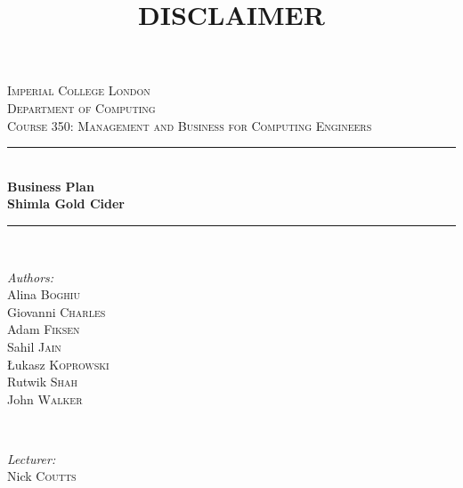 \documentclass[11pt]{article}
\begin{document}

\begin{titlepage}
\newcommand{\HRule}{\rule{\linewidth}{0.5mm}}
\center
\textsc{\LARGE Imperial College London}  \\[1.5cm]
\textsc{\Large Department of Computing}  \\[0.5cm]
\textsc{\large Course 350: Management and Business for Computing Engineers} \\[0.5cm]

\HRule \\[0.3cm]
{\huge \bfseries Business Plan \\ \vspace{0.3cm}Shimla Gold Cider} \\[0.3cm]
\HRule \\[1.5cm]
\begin{minipage}{0.4\textwidth}

\begin{flushleft} \large \emph{Authors:} \\
Alina     \textsc{Boghiu}    \\
Giovanni  \textsc{Charles}   \\
Adam      \textsc{Fiksen}    \\
Sahil     \textsc{Jain}      \\
\L ukasz  \textsc{Koprowski} \\
Rutwik    \textsc{Shah}      \\
John      \textsc{Walker}    \\
\end{flushleft}

\end{minipage}~
\begin{minipage}{0.4\textwidth}

\begin{flushright} \large \emph{Lecturer:} \\
Nick \textsc{Coutts}
\end{flushright}
\end{minipage}\\[4cm]

\end{titlepage}

\title{DISCLAIMER}
\maketitle
\end{document}
